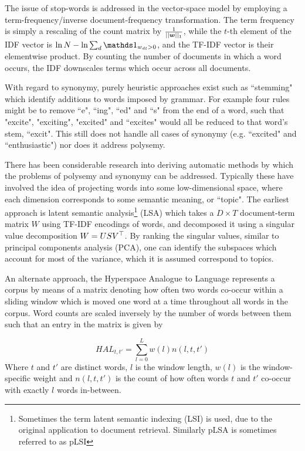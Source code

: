 The issue of stop-words is addressed in the vector-space model by employing a term-frequency/inverse document-frequency transformation. The term frequency is simply a rescaling of the count matrix by $\frac{1}{||\bm w||_1}$, while the $t$-th element of the IDF vector is $\ln N - \ln \sum_d \one_{w_{dt} > 0}$, and the TF-IDF vector is their elementwise product. By counting the number of documents in which a word occurs, the IDF downscales terms which occur across all documents. 

With regard to synonymy, purely heuristic approaches exist such as ``stemming" which identify additions to words imposed by grammar. For example four rules might be to remove ``e", ``ing", ``ed" and ``s" from the end of a word, such that "excite", "exciting", "excited" and ``excites" would all be reduced to that word's stem, ``excit". This still does not handle all cases of synonymy (e.g. ``excited" and ``enthusiastic") nor does it address polysemy.

There has been considerable research into deriving automatic methods by which the problems of polysemy and synonymy can be addressed. Typically these have involved the idea of projecting words into some low-dimensional space, where each dimension corresponds to some semantic meaning, or ``topic". The earliest approach is latent semantic analysis\footnote{Sometimes the term latent semantic indexing (LSI) is used, due to the original application to document retrieval. Similarly pLSA is sometimes referred to as pLSI} (LSA)\cite{Deerwester1990} which takes a $D\times T$ document-term matrix $W$ using TF-IDF encodings of words, and decomposed it using a singular value decomposition $W = USV^\top$. By ranking the singular values, similar to principal components analysis (PCA), one can identify the subspaces which account for most of the variance, which it is assumed correspond to topics.

An alternate approach, the Hyperspace Analogue to Language\cite{Lund1996} represents a corpus by means of a matrix denoting how often two words co-occur within a sliding window which is moved one word at a time throughout all words in the corpus. Word counts are scaled inversely by the number of words between them such that an entry in the matrix is given by 

\begin{equation*}
HAL_{t,t'} = \sum_{l=0}^L w(l) n(l, t, t')
\end{equation*}
Where $t$ and $t'$ are distinct words, $l$ is the window length, $w(l)$ is the window-specific weight and $n(l, t, t')$ is the count of how often words $t$ and $t'$ co-occur with exactly $l$ words in-between.

